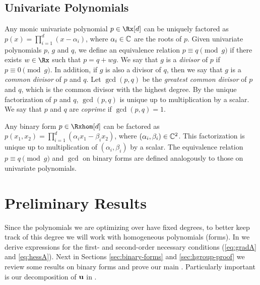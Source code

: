\documentclass[final,onefignum,onetabnum]{siamart220329}
\begin{document}
\subsection{Univariate Polynomials}
Any monic univariate polynomial $p \in \Rx[d]$ can be uniquely factored as
$p(x) = \prod_{i=1}^d (x - \alpha_i)$, where $\alpha_i \in \mathbb{C}$ are the roots of
$p$. Given univariate polynomials $p$, $g$ and $q$, we define an equivalence
relation $p \equiv q \pmod{g}$ if there exists $w \in \Rx$ such that
$p = q + wg$. We say that $g$ is a \emph{divisor} of $p$ if
$p \equiv 0 \pmod{g}$. In addition, if $g$ is also a divisor of $q$, then we say
that $g$ is a \emph{common divisor} of $p$ and $q$. Let $\gcd(p,q)$ be the
\emph{greatest common divisor} of $p$ and $q$, which is the common divisor with
the highest degree. By the unique factorization of $p$ and $q$, $\gcd(p, q)$ is
unique up to multiplication by a scalar. We say that $p$ and $q$ are
\emph{coprime} if $\gcd(p,q) = 1$.

Any binary form $p \in \Rxhom[d]$ can be factored as
$p(x_1, x_2) = \prod_{i=1}^d (\alpha_i x_1 - \beta_i x_2)$, where
$(\alpha_i, \beta_i) \in \mathbb{C}^2$. This factorization is unique up to
multiplication of $(\alpha_i, \beta_i)$ by a scalar. The equivalence relation
$p \equiv q \pmod{g}$ and $\gcd$ on binary forms are defined analogously to
those on univariate polynomials.


\section{Preliminary Results}
Since the polynomials we are optimizing over have fixed degrees, to better keep
track of this degree we will work with homogeneous polynomials (forms). In
 we derive expressions for the first- and second-order
necessary conditions (\eqref{eq:gradA} and \eqref{eq:hessA}). Next in Sections
\ref{sec:binary-forms} and \ref{sec:hgroup-proof} we review some results on
binary forms and prove our main . Particularly important is our
decomposition of $\boldsymbol{\mathbf{u}}$ in .
\end{document}
